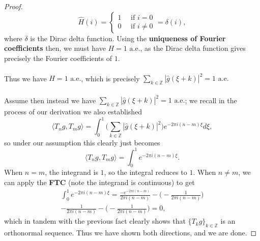 \documentclass[12pt]{article}
\newenvironment{ex}[2][Exercise]{\begin{trivlist}
\item[\hskip \labelsep {\bfseries #1}\hskip \labelsep {\bfseries #2.}]}{\end{trivlist}}
\begin{document}
\begin{ex}{12}
\begin{proof}
        \begin{equation*}\hat{H}(i) = \begin{cases}
            1 \quad \text{ if } i = 0 \\
            0 \quad \text{ if } i \neq 0 
        \end{cases} = \delta(i), \end{equation*}
        where $\delta$ is the Dirac delta function. Using the \textbf{uniqueness of Fourier coefficients} then, we must have $H = 1 \text{ a.e.}$, as the Dirac delta function gives precisely the Fourier coefficients of $1$. \\ \\
        Thus we have $H = 1 \text{ a.e.}$, which is precisely $\sum_{k \in \mathbb{Z}} |\hat{g}(\xi + k)|^2 = 1 \text{ a.e.}$ \\ \\
        Assume then instead we have $\sum_{k \in \mathbb{Z}} |\hat{g}(\xi + k)|^2 = 1 \text{ a.e.}$; we recall in the process of our derivation we also established
        $$\langle T_ng, T_mg \rangle = \int_0^1 \Big ( \sum_{k \in \mathbb{Z}} |\hat{g}(\xi + k)|^2 \Big)e^{-2\pi i(n - m)\xi} d\xi,$$
        so under our assumption this clearly just becomes 
        $$\langle T_ng, T_mg \rangle = \int_0^1 e^{-2\pi i(n - m)\xi}.$$
        When $n = m$, the integrand is $1$, so the integral reduces to $1$. When $n \neq m$, we can apply the \textbf{FTC} (note the integrand is continuous) to get
        \begin{align*}\int_0^1 e^{-2\pi i(n - m)\xi} = \frac{-e^{-2\pi i (n - m)}}{2 \pi i (n -m)} - \Bigg ( - \frac{1}{2\pi i (n-m)} \Bigg) \\
            - \frac{1}{2\pi i (n-m)} - \Bigg ( - \frac{1}{2\pi i (n-m)} \Bigg ) = 0,
        \end{align*}
        which in tandem with the previous fact clearly shows that $\{T_kg\}_{k \in \mathbb{Z}}$ is an orthonormal sequence. Thus we have shown both directions, and we are done.
    \end{proof}
\end{ex}
\end{document}
